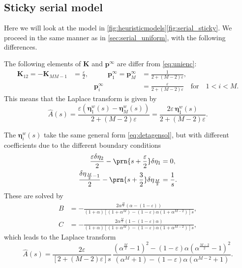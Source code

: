 \documentclass[12pt]{article}
\newcommand{\pr}{\mathbf{p}}
\newcommand{\eq}{\pr^\infty}
\newcommand{\etw}{\boldsymbol{\eta}^w}
\newcommand{\enc}{\mathbf{K}}
\begin{document}
\subsection{Sticky serial model}\label{sec:serial_sticky}

Here we will look at the model in \autoref{fig:heuristicmodels}\ref{fig:serial_sticky}.
We proceed in the same manner as in \autoref{sec:serial_uniform}, with the following differences.

The following elements of $\enc$ and $\eq$ are differ from \eqref{eq:unienc}:
%
\begin{equation}\label{eq:stickyenc}
  \begin{aligned}
  \enc_{12} = -\enc_{MM-1} &= \frac{\varepsilon}{2},
  &\qquad
  \eq_1 = \eq_M &= \frac{1}{2+(M-2)\varepsilon},
  \\ &&
  \eq_i &=  \frac{\varepsilon}{2+(M-2)\varepsilon}
  \quad\text{for}\quad 1<i<M.
  \end{aligned}
\end{equation}
%
This means that the Laplace transform is given by
%
\begin{equation}\label{eq:stickyareaeta}
  \hat{A}(s) = \frac{\varepsilon(\etw_1(s)-\etw_M(s))}{2+(M-2)\varepsilon}
       = \frac{2\varepsilon\, \etw_1(s)}{2+(M-2)\varepsilon}.
\end{equation}
%

The $\etw_i(s)$ take the same general form \eqref{eq:detagensol}, but with different coefficients due to the different boundary conditions
%
\begin{equation}\label{eq:detabndsticky}
\begin{aligned}
  \frac{\varepsilon\delta\eta_2}{2} - \prn{s+\frac{\varepsilon}{2}}\delta\eta_1 &= 0, \\
  \frac{\delta\eta_{\frac{M}{2}-1}}{2} - \prn{s+\frac{3}{2}}\delta\eta_{\frac{M}{2}} &= \frac{1}{s}.
\end{aligned}
\end{equation}
%
These are solved by
%
\begin{equation}\label{eq:stickycoeffs}
\begin{aligned}
  B &= -\frac{ 2 \alpha^{\frac{M}{2}} (\alpha-(1-\varepsilon)) }{ (1+\alpha) [(1+\alpha^{M}) - (1-\varepsilon) \alpha (1+\alpha^{M-2}) ]s}, \\
  C &= -\frac{ 2 \alpha^{\frac{M}{2}} (1-(1-\varepsilon)\alpha) }{ (1+\alpha) [(1+\alpha^{M}) - (1-\varepsilon) \alpha (1+\alpha^{M-2}) ]s},
\end{aligned}
\end{equation}
%
which leads to the Laplace transform
%
\begin{equation}\label{eq:stickylaplace}
  \hat{A}(s) = \frac{2\varepsilon}{[2+(M-2)\varepsilon]s} \,
      \frac{ (\alpha^{\frac{M}{2}}-1)^2 - (1-\varepsilon)\alpha(\alpha^{\frac{M-2}{2}}-1)^2 }{ (\alpha^M + 1) - (1-\varepsilon)\alpha(\alpha^{M-2}+1) }.
\end{equation}
%
\end{document}
